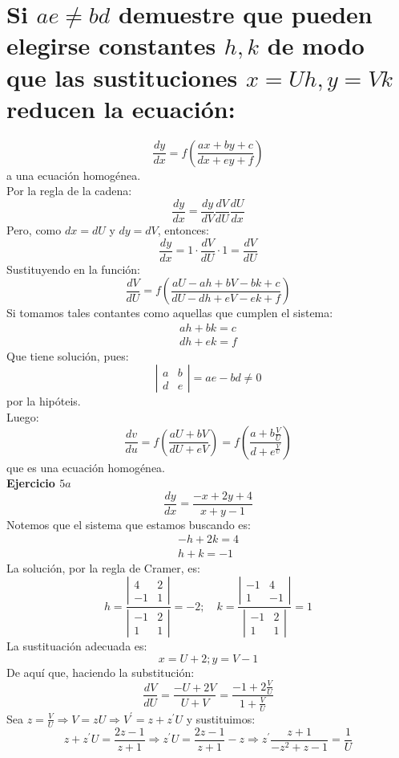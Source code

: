 \section{Si $a e \neq b d$ demuestre que pueden elegirse constantes $h, k$ de modo que las sustituciones $x=U h, y=V k$ reducen la ecuación:}
$$
\frac{d y}{d x}=f\left(\frac{a x+b y+c}{d x+e y+f}\right)
$$
a una ecuación homogénea.\\

Por la regla de la cadena:\\
$$
\frac{d y}{d x}=\frac{d y}{d V} \frac{d V}{d U} \frac{d U}{d x}
$$
Pero, como $d x=d U$ y $d y=d V$, entonces:
$$
\frac{d y}{d x}=1 \cdot \frac{d V}{d U} \cdot 1=\frac{d V}{d U}
$$
Sustituyendo en la función:
$$
\frac{d V}{d U}=f\left(\frac{a U-a h+b V-b k+c}{d U-d h+e V-e k+f}\right)
$$
Si tomamos tales contantes como aquellas que cumplen el sistema:
$$
\begin{array}{l}
a h+b k=c \\
d h+e k=f
\end{array}
$$
Que tiene solución, pues:
$$
\left|\begin{array}{ll}
a & b \\
d & e
\end{array}\right|=a e-b d \neq 0
$$
por la hipóteis.\\

Luego:\\

$$
\frac{d v}{d u}=f\left(\frac{a U+b V}{d U+e V}\right)=f\left(\frac{a+b \frac{V}{U}}{d+e^{\frac{V}{U}}}\right)
$$
que es una ecuación homogénea.\\

\textbf{Ejercicio $5 a$}\\

$$
\frac{d y}{d x}=\frac{-x+2 y+4}{x+y-1}
$$
Notemos que el sistema que estamos buscando es:
$$
\begin{array}{l}
-h+2 k=4 \\
h+k=-1
\end{array}
$$
La solución, por la regla de Cramer, es:
$$
h=\frac{\left|\begin{array}{cc}
4 & 2 \\
-1 & 1
\end{array}\right|}{\left|\begin{array}{cc}
-1 & 2 \\
1 & 1
\end{array}\right|}=-2 ; \quad k=\frac{\left|\begin{array}{cc}
-1 & 4 \\
1 & -1
\end{array}\right|}{\left|\begin{array}{cc}
-1 & 2 \\
1 & 1
\end{array}\right|}=1
$$
La sustituación adecuada es:
$$
x=U+2 ; y=V-1
$$
De aquí que, haciendo la substitución:
$$
\frac{d V}{d U}=\frac{-U+2 V}{U+V}=\frac{-1+2 \frac{V}{U}}{1+\frac{V}{U}}
$$
Sea $z=\frac{V}{U} \Rightarrow V=z U \Rightarrow V^{\prime}=z+z^{\prime} U$ y sustituimos:
$$
z+z^{\prime} U=\frac{2 z-1}{z+1} \Rightarrow z^{\prime} U=\frac{2 z-1}{z+1}-z \Rightarrow z^{\prime} \frac{z+1}{-z^{2}+z-1}=\frac{1}{U}
$$

